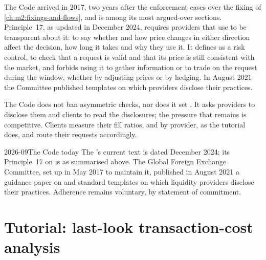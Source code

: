 The Code arrived in 2017, two years after the enforcement cases over the
fixing of \cref{ch:m2:fixings-and-flows}, and  is among its most
argued-over sections. Principle~17, as updated in
December 2024, requires providers that use  to be transparent about it:
to say whether and how price changes in either direction affect the decision,
how long it takes and why they use it. It defines  as a risk control, to
check that a request is valid and that its price is still consistent with the
market, and forbids using it to gather information or to trade on the request
during the window, whether by adjusting prices or by hedging. In August 2021
the Committee published templates on which providers disclose their practices.

\begin{remark}\label{rem:m2:fx-spot-microstructure:open}
The Code does not ban asymmetric checks, nor does it set . It asks
providers to disclose them and clients to read the disclosures; the pressure
that remains is competitive. Clients measure their fill ratios,  and
 by provider, as the tutorial does, and route their requests
accordingly.
\end{remark}

\begin{dated}{2026-09}{The Code today}\label{dat:m2:fx-spot-microstructure:code}
The 's current text is dated December 2024; its Principle~17 on
 is as summarised above. The Global Foreign Exchange Committee, set up
in May 2017 to maintain it, published in August 2021 a guidance paper on  and standard templates on which liquidity providers disclose their
practices. Adherence remains voluntary, by statement of commitment.
\end{dated}

\section{Tutorial: last-look transaction-cost analysis}\label{tut:m2:fx-spot-microstructure:tca}

